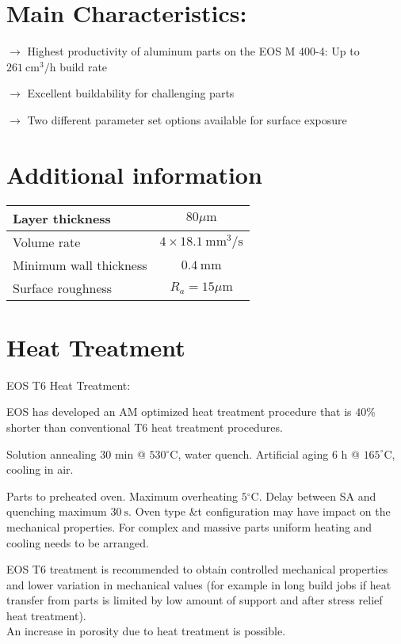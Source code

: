 \documentclass[10pt]{article}
\begin{document}
\section*{Main Characteristics:}
$\longrightarrow$ Highest productivity of aluminum parts on the EOS M 400-4: Up to $261 \mathrm{~cm}^{3} / \mathrm{h}$ build rate

$\longrightarrow$ Excellent buildability for challenging parts

$\longrightarrow$ Two different parameter set options available for surface exposure

\section*{Additional information}
\begin{center}
\begin{tabular}{lc}
\hline
Layer thickness & $80 \mu \mathrm{m}$ \\
\hline
Volume rate & $4 \times 18.1 \mathrm{~mm}^{3} / \mathrm{s}$ \\
\hline
Minimum wall thickness & $0.4 \mathrm{~mm}$ \\
\hline
Surface roughness & $R_{a}=15 \mu \mathrm{m}$ \\
\hline
\end{tabular}
\end{center}

\section*{Heat Treatment}
EOS T6 Heat Treatment:

EOS has developed an AM optimized heat treatment procedure that is $40 \%$ shorter than conventional T6 heat treatment procedures.

Solution annealing 30 min @ $530{ }^{\circ} \mathrm{C}$, water quench. Artificial aging 6 h @ $165^{\circ} \mathrm{C}$, cooling in air.

Parts to preheated oven. Maximum overheating $5{ }^{\circ} \mathrm{C}$. Delay between SA and quenching maximum $30 \mathrm{~s}$. Oven type \&t configuration may have impact on the mechanical properties. For complex and massive parts uniform heating and cooling needs to be arranged.

EOS T6 treatment is recommended to obtain controlled mechanical properties and lower variation in mechanical values (for example in long build jobs if heat transfer from parts is limited by low amount of support and after stress relief heat treatment).\\
An increase in porosity due to heat treatment is possible.
\end{document}

